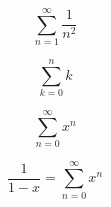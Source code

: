 \documentclass{article}
\begin{document}
\[
\sum_{n=1}^{\infty} \frac{1}{n^2}
\]

\[
\sum_{k=0}^{n} k
\]

\[
\sum_{n=0}^{\infty} x^n
\]

\[
\frac{1}{1-x}=\sum_{n=0}^{\infty}x^n
\]
\end{document}

